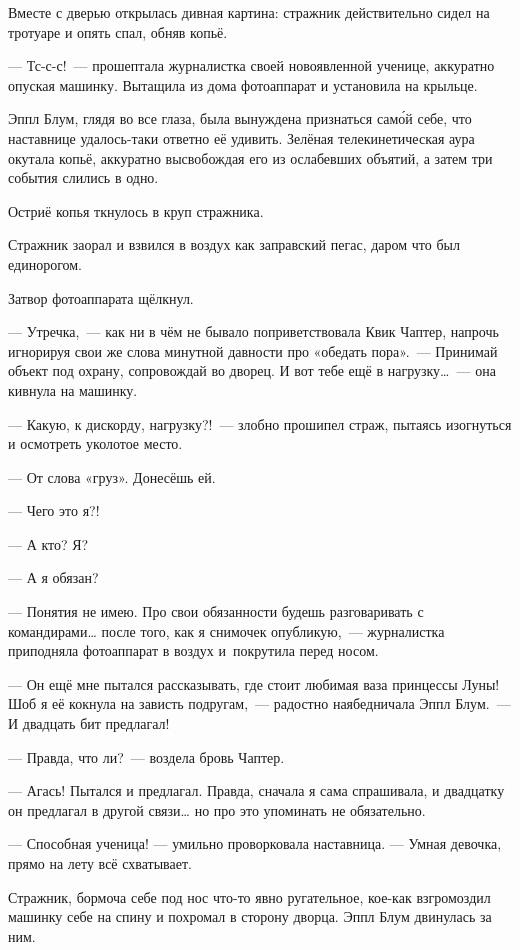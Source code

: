\documentclass[fontsize=11pt,a5paper,titlepage=firstcover]{scrbook}
\begin{document}
Вместе с дверью открылась дивная картина: стражник действительно сидел на тротуаре и опять спал, обняв копьё.

--- Тс-с-с!~--- прошептала журналистка своей новоявленной ученице, аккуратно опуская машинку. Вытащила из дома фотоаппарат и установила на крыльце.

Эппл Блум, глядя во все глаза, была вынуждена признаться само́й себе, что наставнице удалось-таки ответно её удивить. Зелёная телекинетическая аура окутала копьё, аккуратно высвобождая его из ослабевших объятий, а затем три события слились в одно.

Остриё копья ткнулось в круп стражника.

Стражник заорал и взвился в воздух как заправский пегас, даром что был единорогом.

Затвор фотоаппарата щёлкнул.

--- Утречка,~--- как ни в чём не бывало поприветствовала Квик Чаптер, напрочь игнорируя свои же слова минутной давности про «обедать пора».~--- Принимай объект под охрану, сопровождай во дворец. И вот тебе ещё в нагрузку{\ldots}~--- она кивнула на машинку.

--- Какую, к дискорду, нагрузку?!~--- злобно прошипел страж, пытаясь изогнуться и осмотреть уколотое место.

--- От слова «груз». Донесёшь ей.

--- Чего это я?!

--- А кто? Я?

--- А я обязан?

--- Понятия не имею. Про свои обязанности будешь разговаривать с командирами{\ldots} после того, как я снимочек опубликую,~--- журналистка приподняла фотоаппарат в воздух и~покрутила перед носом.

--- Он ещё мне пытался рассказывать, где стоит любимая ваза принцессы Луны! Шоб я её кокнула на зависть подругам,~--- радостно наябедничала Эппл Блум.~--- И двадцать бит предлагал!

--- Правда, что ли?~--- воздела бровь Чаптер.

--- Агась! Пытался и предлагал. Правда, сначала я сама спрашивала, и двадцатку он предлагал в другой связи{\ldots} но про это упоминать не обязательно.

--- Способная ученица! --- умильно проворковала наставница. --- Умная девочка, прямо на лету всё схватывает.

Стражник, бормоча себе под нос что-то явно ругательное, кое-как взгромоздил машинку себе на спину и похромал в сторону дворца. Эппл Блум двинулась за ним.
\end{document}
